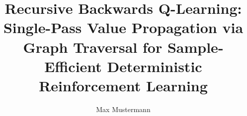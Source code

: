 \documentclass[manuscript, screen, review]{jair}
\begin{document}
\title{Recursive Backwards Q-Learning: Single-Pass Value Propagation via Graph Traversal for Sample-Efficient Deterministic Reinforcement Learning}


\author{Max Mustermann}

\renewcommand{\shortauthors}{Mustermann}
\end{document}
